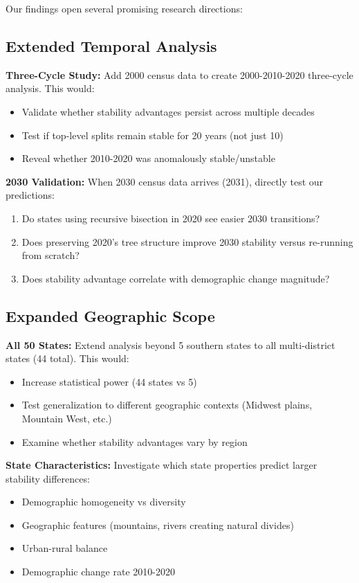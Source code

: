 Our findings open several promising research directions:

\subsection{Extended Temporal Analysis}

\textbf{Three-Cycle Study:} Add 2000 census data to create 2000-2010-2020 three-cycle analysis. This would:
\begin{itemize}
    \item Validate whether stability advantages persist across multiple decades
    \item Test if top-level splits remain stable for 20 years (not just 10)
    \item Reveal whether 2010-2020 was anomalously stable/unstable
\end{itemize}

\textbf{2030 Validation:} When 2030 census data arrives (2031), directly test our predictions:
\begin{enumerate}
    \item Do states using recursive bisection in 2020 see easier 2030 transitions?
    \item Does preserving 2020's tree structure improve 2030 stability versus re-running from scratch?
    \item Does stability advantage correlate with demographic change magnitude?
\end{enumerate}

\subsection{Expanded Geographic Scope}

\textbf{All 50 States:} Extend analysis beyond 5 southern states to all multi-district states (44 total). This would:
\begin{itemize}
    \item Increase statistical power (44 states vs 5)
    \item Test generalization to different geographic contexts (Midwest plains, Mountain West, etc.)
    \item Examine whether stability advantages vary by region
\end{itemize}

\textbf{State Characteristics:} Investigate which state properties predict larger stability differences:
\begin{itemize}
    \item Demographic homogeneity vs diversity
    \item Geographic features (mountains, rivers creating natural divides)
    \item Urban-rural balance
    \item Demographic change rate 2010-2020
\end{itemize}

